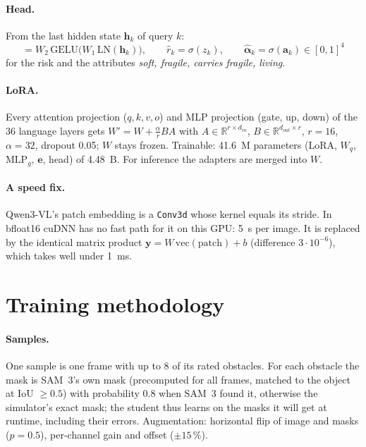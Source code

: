\documentclass[10pt,a4paper]{article}
\newcommand{\code}[1]{\texttt{#1}}
\newcommand{\R}{\mathbb{R}}
\begin{document}
\paragraph{Head.} From the last hidden state $\bm h_k$ of query $k$:
\begin{equation}
[z_k, \bm a_k] = W_2\,\mathrm{GELU}\big(W_1\,\mathrm{LN}(\bm h_k)\big),\qquad \hat r_k = \sigma(z_k),\qquad
\hat{\bm\alpha}_k = \sigma(\bm a_k)\in[0,1]^4
\end{equation}
for the risk and the attributes \emph{soft, fragile, carries fragile, living}.

\paragraph{LoRA.} Every attention projection ($q,k,v,o$) and MLP projection (gate, up, down) of the 36 language layers gets
$W' = W + \tfrac{\alpha}{r}BA$ with $A\in\R^{r\times d_{in}}$, $B\in\R^{d_{out}\times r}$, $r=16$, $\alpha=32$, dropout 0.05;
$W$ stays frozen. Trainable: 41.6~M parameters (LoRA, $W_q$, $\mathrm{MLP}_g$, $\bm e$, head) of 4.48~B. For inference the
adapters are merged into $W$.

\paragraph{A speed fix.} Qwen3-VL's patch embedding is a \code{Conv3d} whose kernel equals its stride. In bfloat16 cuDNN has no
fast path for it on this GPU: 5~s per image. It is replaced by the identical matrix product $\bm y = W\,\mathrm{vec}(\text{patch})+b$
(difference $3\cdot10^{-6}$), which takes well under 1~ms.

\section{Training methodology}

\paragraph{Samples.} One sample is one frame with up to 8 of its rated obstacles. For each obstacle the mask is SAM~3's own mask
(precomputed for all frames, matched to the object at IoU $\geq0.5$) with probability 0.8 when SAM~3 found it, otherwise the
simulator's exact mask; the student thus learns on the masks it will get at runtime, including their errors. Augmentation:
horizontal flip of image and masks ($p=0.5$), per-channel gain and offset ($\pm15\,\%$).
\end{document}
